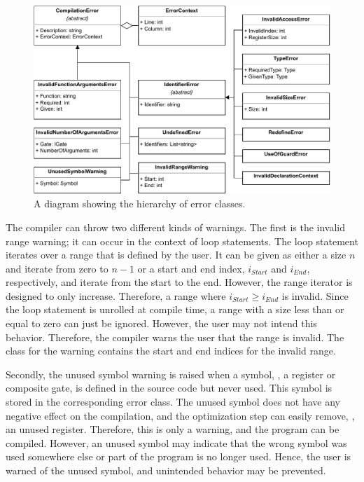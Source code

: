 \begin{figure}[htp]
    \centering
    \includegraphics[width=.9\textwidth]{../figures/drawio/uml_errors.pdf}
    \caption{A diagram showing the hierarchy of error classes.}
    \label{fig:implementation_uml_errors}
\end{figure}

The compiler can throw two different kinds of warnings. The first is the invalid range warning; it can occur in the context of loop statements. The loop statement iterates over a range that is defined by the user. It can be given as either a size $n$ and iterate from zero to $n-1$ or a start and end index, $i_{Start}$ and $i_{End}$, respectively, and iterate from the start to the end. However, the range iterator is designed to only increase. Therefore, a range where $i_{Start} \geq i_{End}$ is invalid. Since the loop statement is unrolled at compile time, a range with a size less than or equal to zero can just be ignored. However, the user may not intend this behavior. Therefore, the compiler warns the user that the range is invalid. The class for the warning contains the start and end indices for the invalid range.

Secondly, the unused symbol warning is raised when a symbol, \eg, a register or composite gate, is defined in the source code but never used. This symbol is stored in the corresponding error class. The unused symbol does not have any negative effect on the compilation, and the optimization step can easily remove, \eg, an unused register. Therefore, this is only a warning, and the program can be compiled. However, an unused symbol may indicate that the wrong symbol was used somewhere else or part of the program is no longer used. Hence, the user is warned of the unused symbol, and unintended behavior may be prevented.

